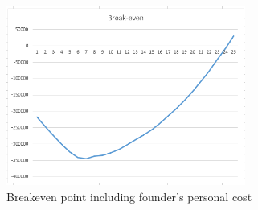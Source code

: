 \begin{figure}[H]
    \centering
    \includegraphics[width=0.7\textwidth]{figures/breakeven_salary.png}
    \caption{Breakeven point including founder's personal cost}
    \label{fig:breakeven_salary}
\end{figure}